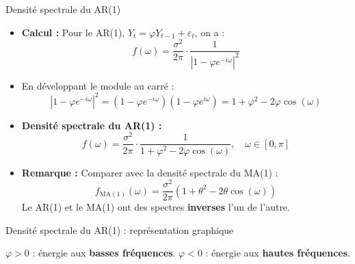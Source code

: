 \documentclass[11pt,aspectratio=169]{beamer}
\begin{document}
\begin{frame}{Densité spectrale du AR(1)}

\begin{itemize}

\item \textbf{Calcul :} Pour le AR(1), $Y_t = \varphi Y_{t-1} + \varepsilon_t$, on a :
\[
f(\omega) = \frac{\sigma^2}{2\pi} \cdot \frac{1}{\left| 1 - \varphi e^{-i\omega} \right|^2}
\]

\item En développant le module au carré :
\[
\left| 1 - \varphi e^{-i\omega} \right|^2 = (1 - \varphi e^{-i\omega})(1 - \varphi e^{i\omega}) = 1 + \varphi^2 - 2\varphi \cos(\omega)
\]

\item \textbf{Densité spectrale du AR(1) :} \[
f(\omega) = \frac{\sigma^2}{2\pi} \cdot \frac{1}{1 + \varphi^2 - 2\varphi \cos(\omega)}, \quad \omega \in [0, \pi]
\]

\item \textbf{Remarque :} Comparer avec la densité spectrale du MA(1) :
\[
f_{\text{MA}(1)}(\omega) = \frac{\sigma^2}{2\pi} \left( 1 + \theta^2 - 2\theta \cos(\omega) \right)
\]
Le AR(1) et le MA(1) ont des spectres \textbf{inverses} l'un de l'autre.

\end{itemize}
\end{frame}

\begin{frame}{Densité spectrale du AR(1) : représentation graphique}
\begin{center}
\end{center}

\begin{center}
\small
$\varphi > 0$ : énergie aux \textbf{basses fréquences}. \quad $\varphi < 0$ : énergie aux \textbf{hautes fréquences}.
\end{center}
\end{frame}
\end{document}
